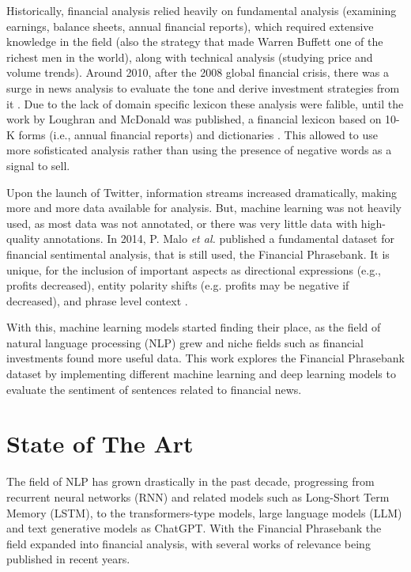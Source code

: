 \documentclass[conference]{IEEEtran}
\begin{document}
Historically, financial analysis relied heavily on fundamental analysis (examining earnings, balance sheets, annual financial reports), which required extensive knowledge in the field (also the strategy that made Warren Buffett one of the richest men in the world), along with technical analysis (studying price and volume trends). Around 2010, after the 2008 global financial crisis, there was a surge in news analysis to evaluate the tone and derive investment strategies from it \cite{tetlock2007giving}. Due to the lack of domain specific lexicon these analysis were falible, until the work by Loughran and McDonald was published, a financial lexicon based on 10-K forms (i.e., annual financial reports) and dictionaries \cite{loughran2011liability}. This allowed to use more sofisticated analysis rather than using the presence of negative words as a signal to sell.

Upon the launch of Twitter, information streams increased dramatically, making more and more data available for analysis. But, machine learning was not heavily used, as most data was not annotated, or there was very little data with high-quality annotations. In 2014, P. Malo \textit{et al.} published a fundamental dataset for financial sentimental analysis, that is still used, the Financial Phrasebank. It is unique, for the inclusion of important aspects as directional expressions (e.g., profits decreased), entity polarity shifts (e.g. profits may be negative if decreased), and phrase level context \cite{malo2014good}.

With this, machine learning models started finding their place, as the field of natural language processing (NLP) grew and niche fields such as financial investments found more useful data. This work explores the Financial Phrasebank dataset by implementing different machine learning and deep learning models to evaluate the sentiment of sentences related to financial news.

\section{State of The Art}

The field of NLP has grown drastically in the past decade, progressing from recurrent neural networks (RNN) and related models such as Long-Short Term Memory (LSTM), to the transformers-type models, large language models (LLM) and text generative models as ChatGPT. With the Financial Phrasebank the field expanded into financial analysis, with several works of relevance being published in recent years.
\end{document}
